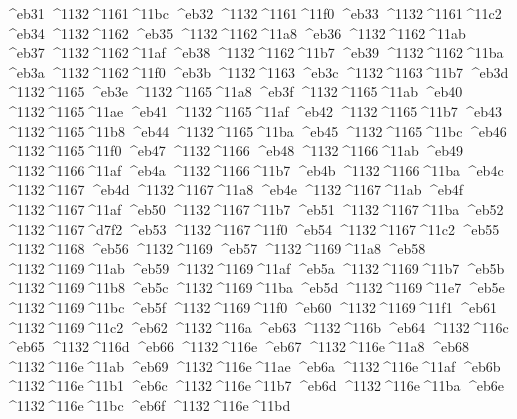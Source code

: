 \checkit ^^^^eb31 ^^^^1132^^^^1161^^^^11bc
\checkit ^^^^eb32 ^^^^1132^^^^1161^^^^11f0
\checkit ^^^^eb33 ^^^^1132^^^^1161^^^^11c2
\checkit ^^^^eb34 ^^^^1132^^^^1162
\checkit ^^^^eb35 ^^^^1132^^^^1162^^^^11a8
\checkit ^^^^eb36 ^^^^1132^^^^1162^^^^11ab
\checkit ^^^^eb37 ^^^^1132^^^^1162^^^^11af
\checkit ^^^^eb38 ^^^^1132^^^^1162^^^^11b7
\checkit ^^^^eb39 ^^^^1132^^^^1162^^^^11ba
\checkit ^^^^eb3a ^^^^1132^^^^1162^^^^11f0
\checkit ^^^^eb3b ^^^^1132^^^^1163
\checkit ^^^^eb3c ^^^^1132^^^^1163^^^^11b7
\checkit ^^^^eb3d ^^^^1132^^^^1165
\checkit ^^^^eb3e ^^^^1132^^^^1165^^^^11a8
\checkit ^^^^eb3f ^^^^1132^^^^1165^^^^11ab
\checkit ^^^^eb40 ^^^^1132^^^^1165^^^^11ae
\checkit ^^^^eb41 ^^^^1132^^^^1165^^^^11af
\checkit ^^^^eb42 ^^^^1132^^^^1165^^^^11b7
\checkit ^^^^eb43 ^^^^1132^^^^1165^^^^11b8
\checkit ^^^^eb44 ^^^^1132^^^^1165^^^^11ba
\checkit ^^^^eb45 ^^^^1132^^^^1165^^^^11bc
\checkit ^^^^eb46 ^^^^1132^^^^1165^^^^11f0
\checkit ^^^^eb47 ^^^^1132^^^^1166
\checkit ^^^^eb48 ^^^^1132^^^^1166^^^^11ab
\checkit ^^^^eb49 ^^^^1132^^^^1166^^^^11af
\checkit ^^^^eb4a ^^^^1132^^^^1166^^^^11b7
\checkit ^^^^eb4b ^^^^1132^^^^1166^^^^11ba
\checkit ^^^^eb4c ^^^^1132^^^^1167
\checkit ^^^^eb4d ^^^^1132^^^^1167^^^^11a8
\checkit ^^^^eb4e ^^^^1132^^^^1167^^^^11ab
\checkit ^^^^eb4f ^^^^1132^^^^1167^^^^11af
\checkit ^^^^eb50 ^^^^1132^^^^1167^^^^11b7
\checkit ^^^^eb51 ^^^^1132^^^^1167^^^^11ba
\checkit ^^^^eb52 ^^^^1132^^^^1167^^^^d7f2
\checkit ^^^^eb53 ^^^^1132^^^^1167^^^^11f0
\checkit ^^^^eb54 ^^^^1132^^^^1167^^^^11c2
\checkit ^^^^eb55 ^^^^1132^^^^1168
\checkit ^^^^eb56 ^^^^1132^^^^1169
\checkit ^^^^eb57 ^^^^1132^^^^1169^^^^11a8
\checkit ^^^^eb58 ^^^^1132^^^^1169^^^^11ab
\checkit ^^^^eb59 ^^^^1132^^^^1169^^^^11af
\checkit ^^^^eb5a ^^^^1132^^^^1169^^^^11b7
\checkit ^^^^eb5b ^^^^1132^^^^1169^^^^11b8
\checkit ^^^^eb5c ^^^^1132^^^^1169^^^^11ba
\checkit ^^^^eb5d ^^^^1132^^^^1169^^^^11e7
\checkit ^^^^eb5e ^^^^1132^^^^1169^^^^11bc
\checkit ^^^^eb5f ^^^^1132^^^^1169^^^^11f0
\checkit ^^^^eb60 ^^^^1132^^^^1169^^^^11f1
\checkit ^^^^eb61 ^^^^1132^^^^1169^^^^11c2
\checkit ^^^^eb62 ^^^^1132^^^^116a
\checkit ^^^^eb63 ^^^^1132^^^^116b
\checkit ^^^^eb64 ^^^^1132^^^^116c
\checkit ^^^^eb65 ^^^^1132^^^^116d
\checkit ^^^^eb66 ^^^^1132^^^^116e
\checkit ^^^^eb67 ^^^^1132^^^^116e^^^^11a8
\checkit ^^^^eb68 ^^^^1132^^^^116e^^^^11ab
\checkit ^^^^eb69 ^^^^1132^^^^116e^^^^11ae
\checkit ^^^^eb6a ^^^^1132^^^^116e^^^^11af
\checkit ^^^^eb6b ^^^^1132^^^^116e^^^^11b1
\checkit ^^^^eb6c ^^^^1132^^^^116e^^^^11b7
\checkit ^^^^eb6d ^^^^1132^^^^116e^^^^11ba
\checkit ^^^^eb6e ^^^^1132^^^^116e^^^^11bc
\checkit ^^^^eb6f ^^^^1132^^^^116e^^^^11bd
